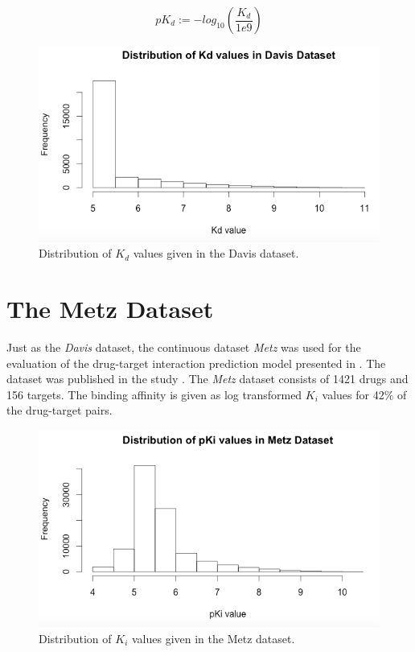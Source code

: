 \begin{equation}
pK_d:= -log_{10}(\frac{K_d}{1e9})
\end{equation}

\begin{figure}
\begin{center}
\includegraphics[scale=0.6]{davis_dist.png}
\end{center}
\caption{Distribution of $K_d$ values given in the Davis dataset.}
\label{fig:numStructure}
\end{figure}

\section{The Metz Dataset}

Just as the \textit{Davis} dataset, the continuous dataset \textit{Metz} was used for the evaluation of the drug-target interaction prediction model presented in \cite{pahikkala2014toward}. The dataset was published in the study \cite{metz2011navigating}. The \textit{Metz} dataset consists of 1421 drugs and 156 targets. The binding affinity is given as log transformed $K_i$ values for 42$\%$ of the drug-target pairs. 

\begin{figure}
\begin{center}
\includegraphics[scale=0.6]{metz_dist.png}
\end{center}
\caption{Distribution of $K_i$ values given in the Metz dataset.}
\label{fig:numStructure}
\end{figure}

